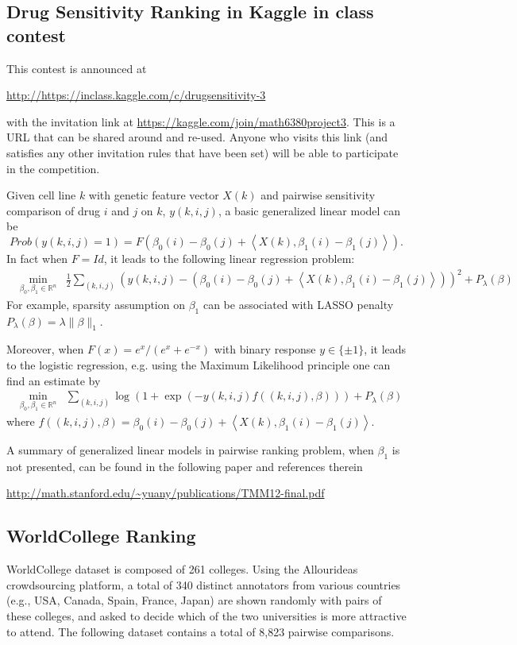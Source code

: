 \documentclass[11pt]{article}
\def\R{{\mathbb R}}
\begin{document}
\subsection{Drug Sensitivity Ranking in Kaggle in class contest}

This contest is announced at

 \url{http://https://inclass.kaggle.com/c/drugsensitivity-3}
 
\noindent with the invitation link at \url{https://kaggle.com/join/math6380project3}. This is a URL that can be shared around and re-used. Anyone who visits this link (and satisfies any other invitation rules that have been set) will be able to participate in the competition.

Given cell line $k$ with genetic feature vector $X(k)$ and pairwise sensitivity comparison of drug $i$ and $j$ on $k$, $y(k,i,j)$, a basic generalized linear model can be 
\begin{equation} Prob( y(k,i,j) = 1) = F(\beta_0(i) - \beta_0(j) + \left< X(k), \beta_1(i) - \beta_1(j)\right>). 
\end{equation}
In fact when $F=Id$, it leads to the following linear regression problem: 
\begin{eqnarray}
& \min_{\beta_0,\beta_1 \in \R^{n}} & \frac{1}{2} \sum_{(k,i,j)} ( y(k,i,j) -  (\beta_0(i) - \beta_0(j) + \left< X(k), \beta_1(i) - \beta_1(j)\right>))^2 + P_\lambda(\beta)
\end{eqnarray}
For example, sparsity assumption on $\beta_1$ can be associated with LASSO penalty $P_\lambda(\beta)=\lambda \| \beta\|_1$. 

Moreover, when $F(x) = e^x / (e^x + e^{-x})$ with binary response $y\in \{\pm1\}$, it leads to the logistic regression, e.g. using the Maximum Likelihood principle one can find an estimate by
\begin{eqnarray}
& \min_{\beta_0,\beta_1 \in \R^{n}} &  \sum_{(k,i,j)}  \log(1+ \exp(-y(k,i,j) f((k,i,j),\beta) )) + P_\lambda(\beta)
\end{eqnarray}
where $f((k,i,j),\beta)= \beta_0(i) - \beta_0(j) + \left< X(k), \beta_1(i) - \beta_1(j)\right>$.

A summary of generalized linear models in pairwise ranking problem, when $\beta_1$ is not presented, can be found in the following paper and references therein

\url{http://math.stanford.edu/~yuany/publications/TMM12-final.pdf}

\subsection{WorldCollege Ranking}
WorldCollege
dataset is composed of 261 colleges. Using the Allourideas
crowdsourcing platform, a total of 340 distinct
annotators from various countries (e.g., USA, Canada,
Spain, France, Japan) are shown randomly with pairs of these colleges, and asked to decide which of the two universities
is more attractive to attend. The following dataset contains a
total of 8,823 pairwise comparisons.
\end{document}
